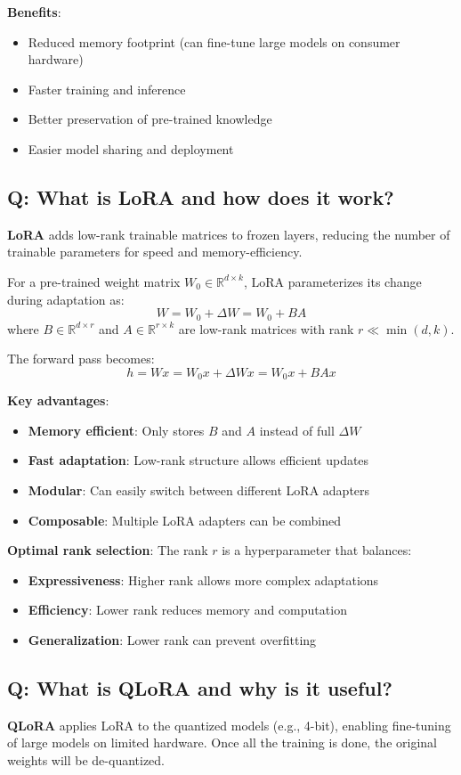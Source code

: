 \textbf{Benefits}:
\begin{itemize}
	\item Reduced memory footprint (can fine-tune large models on consumer hardware)
	\item Faster training and inference
	\item Better preservation of pre-trained knowledge
	\item Easier model sharing and deployment
\end{itemize}

\subsection*{Q: What is LoRA and how does it work?}
\textbf{LoRA} adds low-rank trainable matrices to frozen layers, reducing the number of trainable parameters for speed and memory-efficiency.

For a pre-trained weight matrix \(W_0 \in \mathbb{R}^{d \times k}\), LoRA parameterizes its change during adaptation as:
\[
	W = W_0 + \Delta W = W_0 + BA
\]
where \(B \in \mathbb{R}^{d \times r}\) and \(A \in \mathbb{R}^{r \times k}\) are low-rank matrices with rank \(r \ll \min(d, k)\).

The forward pass becomes:
\[
	h = Wx = W_0x + \Delta Wx = W_0x + BAx
\]

\textbf{Key advantages}:
\begin{itemize}
	\item \textbf{Memory efficient}: Only stores \(B\) and \(A\) instead of full \(\Delta W\)
	\item \textbf{Fast adaptation}: Low-rank structure allows efficient updates
	\item \textbf{Modular}: Can easily switch between different LoRA adapters
	\item \textbf{Composable}: Multiple LoRA adapters can be combined
\end{itemize}

\textbf{Optimal rank selection}:
The rank \(r\) is a hyperparameter that balances:
\begin{itemize}
	\item \textbf{Expressiveness}: Higher rank allows more complex adaptations
	\item \textbf{Efficiency}: Lower rank reduces memory and computation
	\item \textbf{Generalization}: Lower rank can prevent overfitting
\end{itemize}

\subsection*{Q: What is QLoRA and why is it useful?}
\textbf{QLoRA} applies LoRA to the quantized models (e.g., 4-bit), enabling fine-tuning of large models on limited hardware. Once all the training is done, the original weights will be de-quantized.

